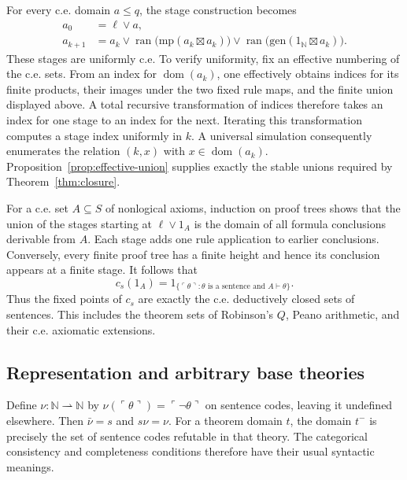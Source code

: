 \documentclass[11pt]{article}
\theoremstyle{definition}
\newcommand{\ran}{\operatorname{ran}}
\begin{document}
For every c.e. domain $a\le q$, the stage construction becomes
\begin{align*}
 a_0&=\ell\vee a,\\
 a_{k+1}&=a_k\vee\ran\bigl(\mathrm{mp}(a_k\boxtimes a_k)\bigr)
                  \vee\ran\bigl(\mathrm{gen}(1_{\mathbb N}\boxtimes a_k)\bigr).
\end{align*}
These stages are uniformly c.e. To verify uniformity, fix an effective
numbering of the c.e. sets. From an index for $\operatorname{dom}(a_k)$,
one effectively obtains indices for its finite products, their images under
the two fixed rule maps, and the finite union displayed above. A total
recursive transformation of indices therefore takes an index for one stage
to an index for the next. Iterating this transformation computes a stage
index uniformly in $k$. A universal simulation consequently enumerates the
relation $(k,x)$ with $x\in\operatorname{dom}(a_k)$.
Proposition~\ref{prop:effective-union} supplies exactly the stable unions
required by Theorem~\ref{thm:closure}.

For a c.e. set $A\subseteq S$ of nonlogical axioms, induction on proof trees
shows that the union of the stages starting at $\ell\vee1_A$ is the domain
of all formula conclusions derivable from $A$. Each stage adds one rule
application to earlier conclusions. Conversely, every finite proof tree
has a finite height and hence its conclusion appears at a finite stage.
It follows that
\begin{equation}\label{eq:arithmetic-closure}
 c_s(1_A)=1_{\{\ulcorner\theta\urcorner:\theta\text{ is a sentence and }A\vdash\theta\}}.
\end{equation}
Thus the fixed points of $c_s$ are exactly the c.e. deductively closed sets
of sentences. This includes the theorem sets of Robinson's $Q$, Peano
arithmetic, and their c.e. axiomatic extensions.

\subsection{Representation and arbitrary base theories}

Define $\nu:\mathbb N\rightharpoonup\mathbb N$ by
$\nu(\ulcorner\theta\urcorner)=\ulcorner\neg\theta\urcorner$ on sentence
codes, leaving it undefined elsewhere. Then $\bar\nu=s$ and $s\nu=\nu$.
For a theorem domain $t$, the domain $t^-$ is precisely the set of sentence
codes refutable in that theory. The categorical consistency and completeness
conditions therefore have their usual syntactic meanings.
\end{document}

